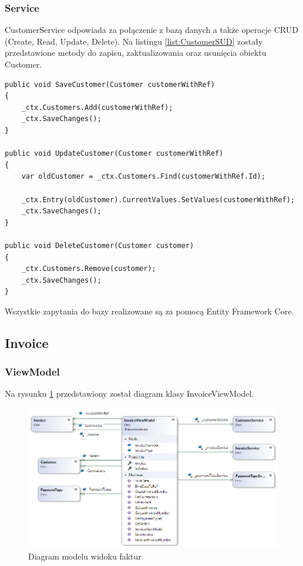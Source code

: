 \subsubsection{Service}
CustomerService odpowiada za połączenie z bazą danych a także operacje CRUD (Create, Read, Update, Delete). Na listingu \ref{list:CustomerSUD} zostały przedstawione metody do zapisu, zaktualizowania oraz usunięcia obiektu Customer.

\begin{lstlisting}[language={[Sharp]C},label=list:CustomerSUD,caption=Przykładowe metody w serwisie CustomerService, basicstyle=\footnotesize\ttfamily]
public void SaveCustomer(Customer customerWithRef)
{
    _ctx.Customers.Add(customerWithRef);
    _ctx.SaveChanges();
}

public void UpdateCustomer(Customer customerWithRef)
{
    var oldCustomer = _ctx.Customers.Find(customerWithRef.Id);

    _ctx.Entry(oldCustomer).CurrentValues.SetValues(customerWithRef);
    _ctx.SaveChanges();
}

public void DeleteCustomer(Customer customer)
{
    _ctx.Customers.Remove(customer);
    _ctx.SaveChanges();
}
\end{lstlisting}

Wszystkie zapytania do bazy realizowane są za pomocą Entity Framework Core. 

\subsection{Invoice}

\subsubsection{ViewModel}
Na rysunku \ref{fig:InvoiceViewModelDiagram} przedstawiony został diagram klasy InvoiceViewModel. 

\begin{figure}[ht!]
  \includegraphics[width=\linewidth]{Rysunki/InvoiceViewModelDiagram.png}
  \caption{Diagram modelu widoku faktur}
  \label{fig:InvoiceViewModelDiagram}
\end{figure}

